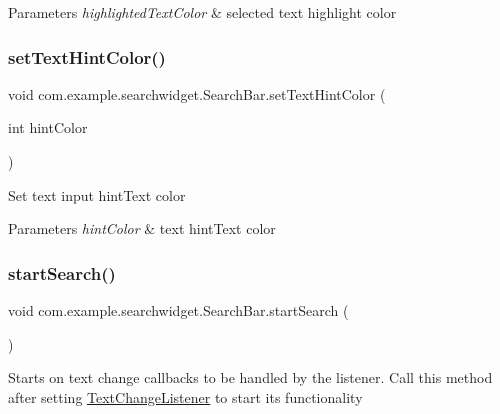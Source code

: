 \begin{DoxyParams}{Parameters}
{\em highlighted\+Text\+Color} & selected text highlight color \\
\hline
\end{DoxyParams}
\mbox{\label{classcom_1_1example_1_1searchwidget_1_1_search_bar_a70b21b5c03c532cb74f64e16c992f95d}} 
\subsubsection{\texorpdfstring{setTextHintColor()}{setTextHintColor()}}
{\footnotesize\ttfamily void com.\+example.\+searchwidget.\+Search\+Bar.\+set\+Text\+Hint\+Color (\begin{DoxyParamCaption}\item[{int}]{hint\+Color }\end{DoxyParamCaption})}

Set text input hint\+Text color


\begin{DoxyParams}{Parameters}
{\em hint\+Color} & text hint\+Text color \\
\hline
\end{DoxyParams}
\mbox{\label{classcom_1_1example_1_1searchwidget_1_1_search_bar_a8cdd994a66ea763883b6d3ed89d2d299}} 
\subsubsection{\texorpdfstring{startSearch()}{startSearch()}}
{\footnotesize\ttfamily void com.\+example.\+searchwidget.\+Search\+Bar.\+start\+Search (\begin{DoxyParamCaption}{ }\end{DoxyParamCaption})}

Starts on text change callbacks to be handled by the listener. Call this method after setting \mbox{\hyperlink{interfacecom_1_1example_1_1searchwidget_1_1_search_bar_1_1_text_change_listener}{Text\+Change\+Listener}} to start its functionality \mbox{\label{classcom_1_1example_1_1searchwidget_1_1_search_bar_af6c85628bb5df58074e37d47193bc3f0}} 
